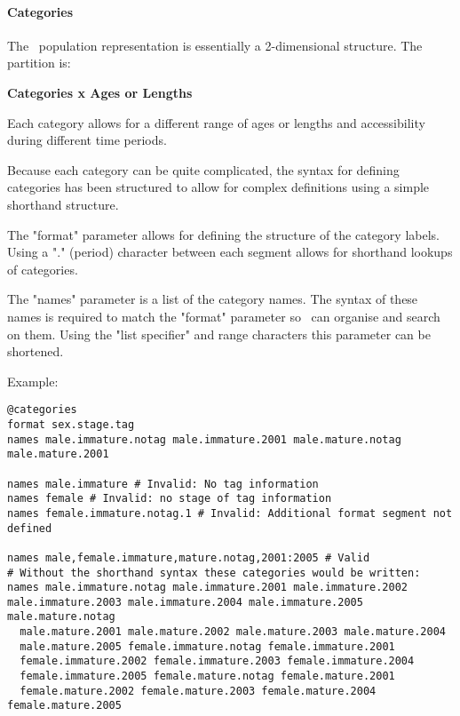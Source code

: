 \paragraph*{Categories}

The \CNAME\ population representation is essentially a 2-dimensional structure. The partition is:

\textbf{Categories x Ages or Lengths}

Each category allows for a different range of ages or lengths and accessibility during different time periods.

Because each category can be quite complicated, the syntax for defining categories has been structured to allow for complex definitions using a simple shorthand structure.

The "format" parameter allows for defining the structure of the category labels. Using a "." (period) character between each segment allows for shorthand lookups of categories.

The "names" parameter is a list of the category names. The syntax of these names is required to match the "format" parameter so \CNAME\ can organise and search on them. Using the "list specifier" and range characters this parameter can be shortened.

Example:

{\small{\begin{verbatim}
@categories
format sex.stage.tag
names male.immature.notag male.immature.2001 male.mature.notag male.mature.2001

names male.immature # Invalid: No tag information
names female # Invalid: no stage of tag information
names female.immature.notag.1 # Invalid: Additional format segment not defined

names male,female.immature,mature.notag,2001:2005 # Valid
# Without the shorthand syntax these categories would be written:
names male.immature.notag male.immature.2001 male.immature.2002
male.immature.2003 male.immature.2004 male.immature.2005 male.mature.notag
  male.mature.2001 male.mature.2002 male.mature.2003 male.mature.2004
  male.mature.2005 female.immature.notag female.immature.2001
  female.immature.2002 female.immature.2003 female.immature.2004
  female.immature.2005 female.mature.notag female.mature.2001
  female.mature.2002 female.mature.2003 female.mature.2004 female.mature.2005
\end{verbatim}}}

